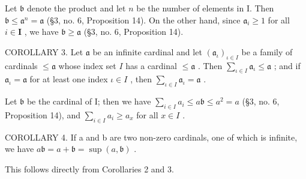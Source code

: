 Let \(\mathfrak{b}\) denote the product and let \(n\) be the number of elements in I. Then \(\mathfrak{b} \leqslant \mathfrak{a}^n = \mathfrak{a}\) (§3, no. 6, Proposition 14). On the other hand, since \(\mathfrak{a}_i \geqslant 1\) for all \(i \in \mathbf{I}\) , we have \(\mathfrak{b} \geqslant \mathfrak{a}\) (§3, no. 6, Proposition 14).

COROLLARY 3. Let \(\mathfrak{a}\) be an infinite cardinal and let \((\mathfrak{a}_{\iota})_{\iota \in I}\) be a family of cardinals \(\leqslant \mathfrak{a}\) whose index set \(I\) has a cardinal \(\leqslant \mathfrak{a}\) . Then \(\sum_{\iota \in I} \mathfrak{a}_{\iota} \leqslant \mathfrak{a}\) ; and if \(\mathfrak{a}_{\iota} = \mathfrak{a}\) for at least one index \(\iota \in I\) , then \(\sum_{\iota \in I} \mathfrak{a}_{\iota} = \mathfrak{a}\) .

Let \(\mathfrak{b}\) be the cardinal of I; then we have \(\sum_{i\in I}a_i\leqslant a\mathfrak{b}\leqslant a^2 = a\) (§3, no. 6, Proposition 14), and \(\sum_{i\in I}a_i\geqslant a_x\) for all \(x\in I\) .

COROLLARY 4. If a and b are two non-zero cardinals, one of which is infinite, we have \(a\mathfrak{b} = a + \mathfrak{b} = \sup(a, \mathfrak{b})\) .

This follows directly from Corollaries 2 and 3.

